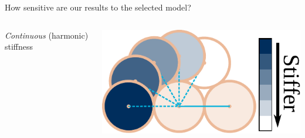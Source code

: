 \documentclass[aspectratio=169]{beamer}
\begin{document}
\begin{frame}[t]{How sensitive are our results to the selected model?}
{\begin{columns}[T]
    \centering

    \textcolor{FigPurple}{\Large \emph{Continuous} (harmonic) stiffness}

    \includegraphics[scale=0.65]{../figures/fig-all_potentials/fig-bend/fig-bend_harm.pdf}

  \end{columns}

  }

\end{frame}
\end{document}
